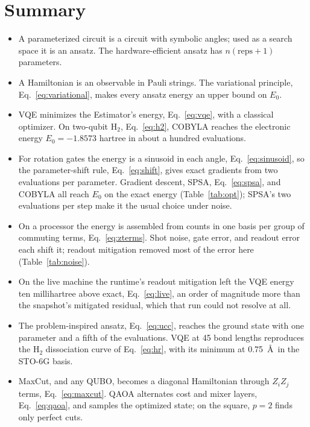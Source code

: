 \documentclass[11pt]{article}
\begin{document}
\section{Summary}

\begin{itemize}
\item A parameterized circuit is a circuit with symbolic angles; used as a search space it is an ansatz. The hardware-efficient ansatz has $n(\text{reps}+1)$ parameters.
\item A Hamiltonian is an observable in Pauli strings. The variational principle, Eq.~\eqref{eq:variational}, makes every ansatz energy an upper bound on $E_0$.
\item VQE minimizes the Estimator's energy, Eq.~\eqref{eq:vqe}, with a classical optimizer. On two-qubit $\mathrm{H}_2$, Eq.~\eqref{eq:h2}, COBYLA reaches the electronic energy $E_0 = -1.8573$ hartree in about a hundred evaluations.
\item For rotation gates the energy is a sinusoid in each angle, Eq.~\eqref{eq:sinusoid}, so the parameter-shift rule, Eq.~\eqref{eq:shift}, gives exact gradients from two evaluations per parameter. Gradient descent, SPSA, Eq.~\eqref{eq:spsa}, and COBYLA all reach $E_0$ on the exact energy (Table~\ref{tab:opt}); SPSA's two evaluations per step make it the usual choice under noise.
\item On a processor the energy is assembled from counts in one basis per group of commuting terms, Eq.~\eqref{eq:zterms}. Shot noise, gate error, and readout error each shift it; readout mitigation removed most of the error here (Table~\ref{tab:noise}).
\item On the live machine the runtime's readout mitigation left the VQE energy ten millihartree above exact, Eq.~\eqref{eq:live}, an order of magnitude more than the snapshot's mitigated residual, which that run could not resolve at all.
\item The problem-inspired ansatz, Eq.~\eqref{eq:ucc}, reaches the ground state with one parameter and a fifth of the evaluations. VQE at 45 bond lengths reproduces the $\mathrm{H}_2$ dissociation curve of Eq.~\eqref{eq:hr}, with its minimum at 0.75~\AA\ in the STO-6G basis.
\item MaxCut, and any QUBO, becomes a diagonal Hamiltonian through $Z_iZ_j$ terms, Eq.~\eqref{eq:maxcut}. QAOA alternates cost and mixer layers, Eq.~\eqref{eq:qaoa}, and samples the optimized state; on the square, $p = 2$ finds only perfect cuts.
\end{itemize}
\end{document}
